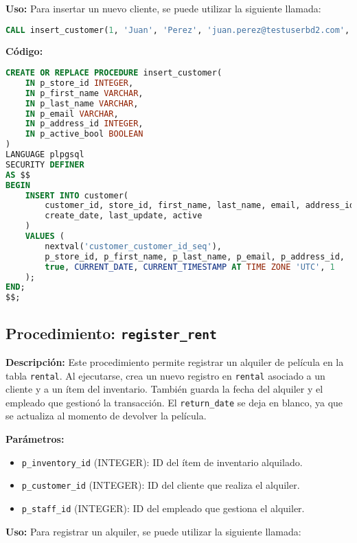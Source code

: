 \documentclass{article}
\begin{document}
\textbf{Uso:}
Para insertar un nuevo cliente, se puede utilizar la siguiente llamada:

\begin{lstlisting}[language=SQL]
CALL insert_customer(1, 'Juan', 'Perez', 'juan.perez@testuserbd2.com', 101, TRUE);
\end{lstlisting}

\textbf{Código:}
\begin{lstlisting}[language=SQL]
CREATE OR REPLACE PROCEDURE insert_customer(
    IN p_store_id INTEGER,        
    IN p_first_name VARCHAR,      
    IN p_last_name VARCHAR,       
    IN p_email VARCHAR,           
    IN p_address_id INTEGER,      
    IN p_active_bool BOOLEAN      
)
LANGUAGE plpgsql
SECURITY DEFINER
AS $$
BEGIN
    INSERT INTO customer(
        customer_id, store_id, first_name, last_name, email, address_id, activebool, 
        create_date, last_update, active
    )
    VALUES (
        nextval('customer_customer_id_seq'),
        p_store_id, p_first_name, p_last_name, p_email, p_address_id,
        true, CURRENT_DATE, CURRENT_TIMESTAMP AT TIME ZONE 'UTC', 1
    );
END;
$$;
\end{lstlisting}

\subsection{Procedimiento: \texttt{register\_rent}}

\textbf{Descripción:}  
Este procedimiento permite registrar un alquiler de película en la tabla \texttt{rental}. Al ejecutarse, crea un nuevo registro en \texttt{rental} asociado a un cliente y a un ítem del inventario. También guarda la fecha del alquiler y el empleado que gestionó la transacción. El \texttt{return\_date} se deja en blanco, ya que se actualiza al momento de devolver la película.

\textbf{Parámetros:}
\begin{itemize}
    \item \texttt{p\_inventory\_id} (INTEGER): ID del ítem de inventario alquilado.
    \item \texttt{p\_customer\_id} (INTEGER): ID del cliente que realiza el alquiler.
    \item \texttt{p\_staff\_id} (INTEGER): ID del empleado que gestiona el alquiler.
\end{itemize}

\textbf{Uso:}
Para registrar un alquiler, se puede utilizar la siguiente llamada:
\end{document}
